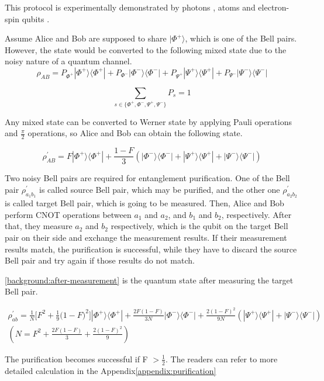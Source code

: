 This protocol is experimentally demonstrated by photons \cite{Yan:21}, atoms \cite{179436} and electron-spin qubits \cite{kalb2017entanglement}.


Assume Alice and Bob are supposed to share $|\Phi^+\rangle$, which is one of the Bell pairs. However, the state would be converted to the following mixed state due to the noisy nature of a quantum channel.
$$ \rho_{AB} = P_{\Phi^+}|\Phi^+\rangle\langle\Phi^+| + P_{\Phi^-}|\Phi^-\rangle\langle\Phi^-| + P_{\Psi^+}|\Psi^+\rangle\langle\Psi^+| + P_{\Psi^-}|\Psi^-\rangle\langle\Psi^-|$$

$$\sum_{s \in \{\Phi^+, \Phi^-, \Psi^+, \Psi^- \}} P_{s} = 1$$

Any mixed state can be converted to Werner state by applying Pauli operations and $\frac{\pi}{2}$ operations, so Alice and Bob can obtain the following state.

$$ \rho^{'}_{AB} = F|\Phi^+\rangle\langle\Phi^+| + \frac{1-F}{3}(|\Phi^-\rangle\langle\Phi^-| + |\Psi^+\rangle\langle\Psi^+| + |\Psi^-\rangle\langle\Psi^-|)$$


Two noisy Bell pairs are required for entanglement purification. One of the Bell pair $\rho^{'}_{a_1 b_1}$ is called source Bell pair, which may be purified, and the other one $\rho^{'}_{a_2 b_2}$  is called target Bell pair, which is going to be measured. 
Then, Alice and Bob perform CNOT operations between $a_1$ and $a_2$, and $b_1$ and $b_2$, respectively.
After that, they measure $a_2$ and $b_2$ respectively, which is the qubit on the target Bell pair on their side and exchange the measurement results. 
If their measurement results match, the purification is successful, while they have to discard the source Bell pair and try again if those results do not match.

\ref{background:after-measurement} is the quantum state after measuring the target Bell pair.

\begin{multline*}
\rho^{'}_{ab} = \frac{1}{N} \big[ F^2 + \frac{1}{9}\big(1-F \big)^2\big]|\Phi^+\rangle\langle\Phi^+| + \frac{2F(1-F)}{3N}|\Phi^-\rangle\langle\Phi^-| + \frac{2(1-F)^2}{9N}(|\Psi^+\rangle\langle\Psi^+| + |\Psi^-\rangle\langle\Psi^-|) \\
(N = F^2 + \frac{2F(1-F)}{3} + \frac{2(1-F)^2}{9})
\label{background:after-measurement}
\end{multline*}

The purification becomes successful if F  $> \frac{1}{2}$. The readers can refer to more detailed calculation in the Appendix\ref{appendix:purification}

